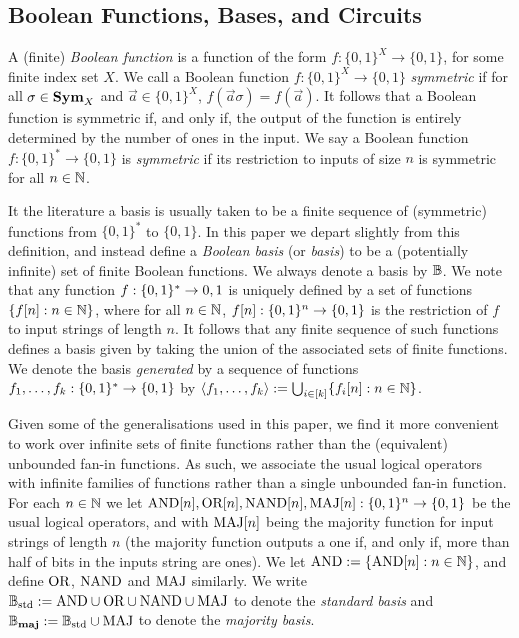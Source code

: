 \documentclass[../paper.tex]{subfiles}
\begin{document}
\subsection{Boolean Functions, Bases, and Circuits}
A (finite) \emph{Boolean function} is a function of the form $f: \{0,1\}^X
\rightarrow \{0,1\}$, for some finite index set $X$. We call a Boolean function
$f: \{0,1\}^X \rightarrow \{0,1\}$ \emph{symmetric} if for all $\sigma \in
\text{\textbf{Sym}}_X$ and $\vec{a} \in \{0,1\}^X$, $f (\vec{a} \sigma) = f(\vec{a})$. It
follows that a Boolean function is symmetric if, and only if, the output of the
function is entirely determined by the number of ones in the input. We say a
Boolean function $f : \{0,1\}^{*} \rightarrow \{0,1\}$ is \emph{symmetric} if
its restriction to inputs of size $n$ is symmetric for all $n \in \mathbb{N}$.

It the literature a basis is usually taken to be a finite sequence of
(symmetric) functions from $\{0,1\}^*$ to $\{0,1\}$. In this paper we depart
slightly from this definition, and instead define a \emph{Boolean basis} (or
\emph{basis}) to be a (potentially infinite) set of finite Boolean functions. We
always denote a basis by $\mathbb{B}$. We note that any function $f:\{0,1\}^* \rightarrow
{0,1}$ is uniquely defined by a set of functions $\{f[n] : n \in \mathbb{N}\}$, where
for all $n \in \mathbb{N}$, $f[n]:\{0,1\}^n \rightarrow \{0,1\}$ is the restriction of $f$ to
input strings of length $n$. It follows that any finite sequence of such
functions defines a basis given by taking the union of the associated sets of
finite functions. We denote the basis \emph{generated} by a sequence of
functions $f_1, \ldots, f_k : \{0,1\}^* \rightarrow \{0,1\}$ by $\langle f_1, \ldots,
f_k \rangle := \bigcup_{i \in [k]} \{f_i[n] : n \in \mathbb{N}\}$.

Given some of the generalisations used in this paper, we find it more convenient
to work over infinite sets of finite functions rather than the (equivalent)
unbounded fan-in functions. As such, we associate the usual logical operators
with infinite families of functions rather than a single unbounded fan-in
function. For each $n \in \mathbb{N}$ we let $\text{\upshape AND}[n], \text{\upshape OR}[n], \text{\upshape NAND}[n], \text{\upshape MAJ}[n] :
\{0,1\}^n \rightarrow \{0,1\}$ be the usual logical operators, and with
$\text{\upshape MAJ}[n]$ being the majority function for input strings of length $n$ (the
majority function outputs a one if, and only if, more than half of bits in the
inputs string are ones). We let $\text{\upshape AND} := \{\text{\upshape AND}[n] : n \in \mathbb{N}\}$, and define
$\text{\upshape OR}$, $\text{\upshape NAND}$ and $\text{\upshape MAJ}$ similarly. We write $\mathbb{B}_{\text{std}} := \text{\upshape AND} \cup \text{\upshape OR} \cup \text{\upshape NAND}
\cup \text{\upshape MAJ}$ to denote the \emph{standard basis} and $\mathbb{B}_{\text{\textbf{maj}}} := \mathbb{B}_{\text{std}} \cup \text{\upshape MAJ}$ to
denote the \emph{majority basis}.
\end{document}
